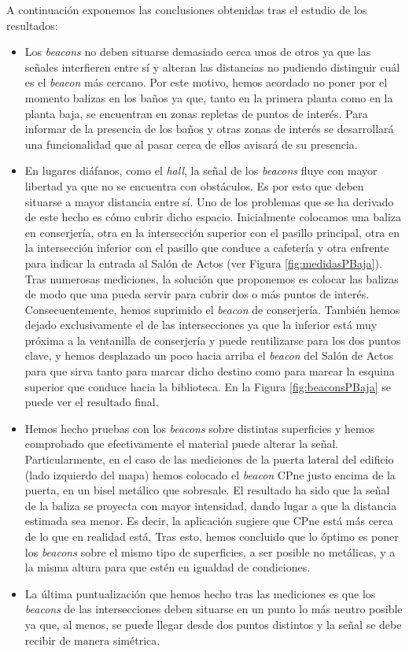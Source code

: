 A continuación exponemos las conclusiones obtenidas tras el estudio de los resultados:
\begin{itemize}
	\item Los \textit{beacons} no deben situarse demasiado cerca unos de otros ya que las señales interfieren entre sí y alteran las distancias no pudiendo distinguir cuál es el \textit{beacon} más cercano. Por este motivo, hemos acordado no poner por el momento balizas en los baños ya que, tanto en la primera planta como en la planta baja, se encuentran en zonas repletas de puntos de interés. Para informar de la presencia de los baños y otras zonas de interés se desarrollará una funcionalidad que al pasar cerca de ellos avisará de su presencia.
	
	\item En lugares diáfanos, como el \textit{hall}, la señal de los \textit{beacons} fluye con mayor libertad ya que no se encuentra con obstáculos. Es por esto que deben situarse a mayor distancia entre sí. Uno de los problemas que se ha derivado de este hecho es cómo cubrir dicho espacio. Inicialmente colocamos una baliza en conserjería, otra en la intersección superior con el pasillo principal, otra en la intersección inferior con el pasillo que conduce a cafetería y otra enfrente para indicar la entrada al Salón de Actos (ver Figura \ref{fig:medidasPBaja}). Tras numerosas mediciones, la solución que proponemos es colocar las balizas de modo que una pueda servir para cubrir dos o más puntos de interés. Consecuentemente, hemos suprimido el \textit{beacon} de conserjería. También hemos dejado exclusivamente el de las intersecciones ya que la inferior está muy próxima a la ventanilla de conserjería y puede reutilizarse para los dos puntos clave, y hemos desplazado un poco hacia arriba el \textit{beacon} del Salón de Actos para que sirva tanto para marcar dicho destino como para marcar la esquina superior que conduce hacia la biblioteca. En la Figura \ref{fig:beaconsPBaja} se puede ver el resultado final.
	
	\item Hemos hecho pruebas con los \textit{beacons} sobre distintas superficies y hemos comprobado que efectivamente el material puede alterar la señal. Particularmente, en el caso de las mediciones de la puerta lateral del edificio (lado izquierdo del mapa) hemos colocado el \textit{beacon} CPne justo encima de la puerta, en un bisel metálico que sobresale. El resultado ha sido que la señal de la baliza se proyecta con mayor intensidad, dando lugar a que la distancia estimada sea menor. Es decir, la aplicación sugiere que CPne está más cerca de lo que en realidad está. Tras esto, hemos concluido que lo óptimo es poner los \textit{beacons} sobre el mismo tipo de superficies, a ser posible no metálicas, y a la misma altura para que estén en igualdad de condiciones. 
	
	\item La última puntualización que hemos hecho tras las mediciones es que los \textit{beacons} de las intersecciones deben situarse en un punto lo más neutro posible ya que, al menos, se puede llegar desde dos puntos distintos y la señal se debe recibir de manera simétrica. 
\end{itemize}


